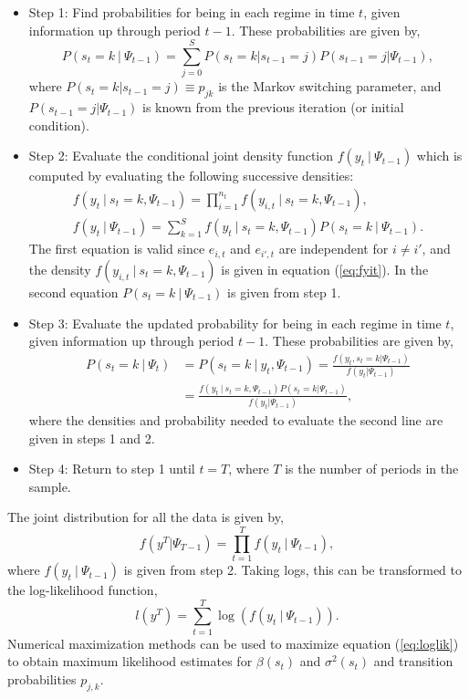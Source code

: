 \documentclass[12pt]{article}
\newcommand{\bi}{\begin{itemize}}
\newcommand{\ei}{\end{itemize}}
\newcommand{\beq}{\begin{equation}}
\newcommand{\eeq}{\end{equation}}
\newcommand{\bdm}{\begin{displaymath}}
\newcommand{\edm}{\end{displaymath}}
\newcommand{\ds}{\displaystyle}
\begin{document}
\bi
\item Step 1: Find probabilities for being in each regime in time $t$, given information up through period $t-1$.  These probabilities are given by,
\bdm P(s_t=k~|~\Psi_{t-1}) = \sum_{j=0}^{S} P(s_t=k | s_{t-1}=j) P(s_{t-1}=j | \Psi_{t-1}), \edm
where $P(s_t=k | s_{t-1}=j) \equiv p_{jk}$ is the Markov switching parameter, and $P(s_{t-1}=j | \Psi_{t-1})$ is known from the previous iteration (or initial condition).

\item Step 2: Evaluate the conditional joint density function $f(y_t ~|~ \Psi_{t-1})$ which is computed by evaluating the following successive densities:
\bdm \begin{array}{l} \ds f(y_t ~|~ s_t=k, \Psi_{t-1}) = \prod_{i=1}^{n_t} f(y_{i,t} ~|~ s_t=k, \Psi_{t-1}), \\ [1pc]
\ds f(y_t ~|~ \Psi_{t-1}) = \sum_{k=1}^{S} f(y_t ~|~ s_t=k, \Psi_{t-1}) P(s_t=k ~|~ \Psi_{t-1}). \end{array} \edm
The first equation is valid since $e_{i,t}$ and $e_{i',t}$ are independent for $i\neq i'$, and the density $f(y_{i,t} ~|~ s_t=k, \Psi_{t-1})$ is given in equation (\ref{eq:fyit}).  In the second equation $P(s_t=k ~|~ \Psi_{t-1})$ is given from step 1.

\item Step 3: Evaluate the updated probability for being in each regime in time $t$, given information up through period $t-1$.  These probabilities are given by,
\bdm \begin{array}{ll} \ds P(s_t=k~|~\Psi_{t}) & \ds = P(s_t=k~|~y_t, \Psi_{t-1}) = \frac{f(y_t, s_t=k | \Psi_{t-1})}{f(y_t | \Psi_{t-1})} \\ [2pc]
 & \ds = \frac{f(y_t ~|~ s_t=k, \Psi_{t-1}) P(s_t=k | \Psi_{t-1})}{f(y_t|\Psi_{t-1})}, \end{array} \edm
where the densities and probability needed to evaluate the second line are given in steps 1 and 2.

\item Step 4: Return to step 1 until $t=T$, where $T$ is the number of periods in the sample.
\ei

The joint distribution for all the data is given by,
\beq \label{eq:jointden} f(y^T | \Psi_{T-1}) = \prod_{t=1}^{T} f(y_t ~|~ \Psi_{t-1}), \eeq
where $f(y_t ~|~ \Psi_{t-1})$ is given from step 2.  Taking logs, this can be transformed to the log-likelihood function,
\beq \label{eq:loglik} l(y^T) = \sum_{t=1}^{T} \log \left( f(y_t ~|~ \Psi_{t-1}) \right). \eeq
Numerical maximization methods can be used to maximize equation (\ref{eq:loglik}) to obtain maximum likelihood estimates for $\beta(s_t)$ and $\sigma^2(s_t)$ and transition probabilities $p_{j,k}$. 
\end{document}
